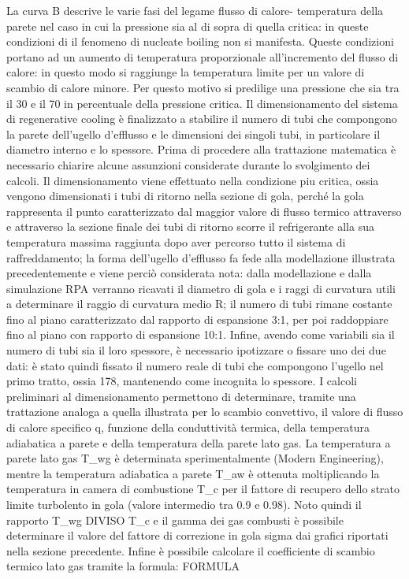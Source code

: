 La curva B descrive le varie fasi del legame flusso di calore- temperatura della parete nel caso in cui la pressione sia al di sopra di quella critica: in queste condizioni di il fenomeno di nucleate boiling non si manifesta. Queste condizioni portano ad un aumento di temperatura proporzionale all'incremento del flusso di calore: in questo modo si raggiunge la temperatura limite per un valore di scambio di calore minore. Per questo motivo si predilige una pressione che sia tra il 30 e il 70 in percentuale della pressione critica.
Il dimensionamento del sistema di regenerative cooling è finalizzato a stabilire il numero di tubi che compongono la parete dell'ugello d'efflusso e le dimensioni dei singoli tubi, in particolare il diametro interno e lo spessore. Prima di procedere alla trattazione matematica è necessario chiarire alcune assunzioni considerate durante lo svolgimento dei calcoli. Il dimensionamento viene effettuato nella condizione piu critica, ossia vengono dimensionati i tubi di ritorno nella sezione di gola, perché la gola rappresenta il punto caratterizzato dal maggior valore di flusso termico attraverso e attraverso la sezione finale dei tubi di ritorno scorre il refrigerante alla sua temperatura massima raggiunta dopo aver percorso tutto il sistema di raffreddamento; la forma dell'ugello d'efflusso fa fede alla modellazione illustrata precedentemente e viene perciò considerata nota: dalla modellazione e dalla simulazione RPA verranno ricavati il diametro di gola e i raggi di curvatura utili a determinare il raggio di curvatura medio R; il numero di tubi rimane costante fino al piano caratterizzato dal rapporto di espansione 3:1, per poi raddoppiare fino al piano con rapporto di espansione 10:1. Infine, avendo come variabili sia il numero di tubi sia il loro spessore, è necessario ipotizzare o fissare uno dei due dati: è stato quindi fissato il numero reale di tubi che compongono l'ugello nel primo tratto, ossia 178, mantenendo come incognita lo spessore.
I calcoli preliminari al dimensionamento permettono di determinare, tramite una trattazione analoga a quella illustrata per lo scambio convettivo, il valore di flusso di calore specifico q, funzione della conduttività termica, della temperatura adiabatica a parete e della temperatura della parete lato gas. 
La temperatura a parete lato gas T_{wg} è determinata sperimentalmente (Modern Engineering), mentre la temperatura adiabatica a parete T_{aw} è ottenuta moltiplicando la temperatura in camera di combustione T_c per il fattore di recupero dello strato limite turbolento in gola (valore intermedio tra 0.9 e 0.98). Noto quindi il rapporto T_{wg} DIVISO {T_}c e il gamma dei gas combusti è possibile determinare il valore del fattore di correzione in gola sigma dai grafici riportati nella sezione precedente. Infine è possibile calcolare il coefficiente di scambio termico lato gas tramite la formula: FORMULA
